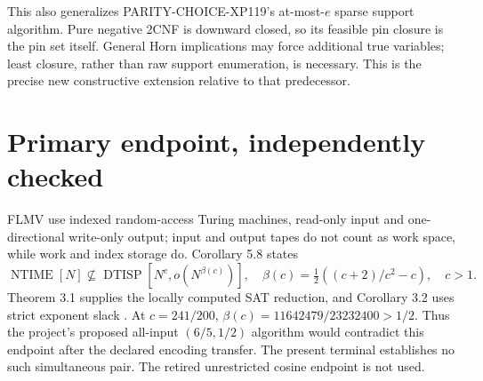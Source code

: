 \documentclass[11pt]{article}
\begin{document}
This also generalizes PARITY-CHOICE-XP119's at-most-$e$ sparse support
algorithm. Pure negative 2CNF is downward closed, so its feasible pin closure
is the pin set itself. General Horn implications may force additional true
variables; least closure, rather than raw support enumeration, is necessary.
This is the precise new constructive extension relative to that predecessor.

\section{Primary endpoint, independently checked}
FLMV use indexed random-access Turing machines, read-only input and
one-directional write-only output; input and output tapes do not count as
work space, while work and index storage do. Corollary 5.8 states
\[
 \operatorname{NTIME}[N]\not\subseteq
 \operatorname{DTISP}[N^c,o(N^{\beta(c)})],\quad
 \beta(c)=\tfrac12((c+2)/c^2-c),\quad c>1.
\]
Theorem 3.1 supplies the locally computed SAT reduction, and Corollary 3.2
uses strict exponent slack \cite{flmv}. At $c=241/200$,
$\beta(c)=11642479/23232400>1/2$. Thus the project's proposed all-input
$(6/5,1/2)$ algorithm would contradict this endpoint after the declared
encoding transfer. The present terminal establishes no such simultaneous
pair. The retired unrestricted cosine endpoint is not used.
\end{document}
